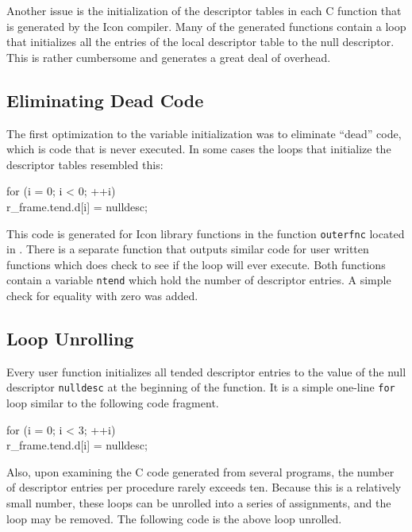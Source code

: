 Another issue is the initialization of the descriptor tables in each C
function that is generated by the Icon compiler.  Many of the
generated functions contain a loop that initializes all the entries of
the local descriptor table to the null descriptor. This is rather
cumbersome and generates a great deal of overhead.


\subsection{Eliminating Dead Code}

The first optimization to the variable initialization was to eliminate
``dead'' code, which is code that is never executed. In some cases the
loops that initialize the descriptor tables resembled this:

\goodbreak
\begin{iconcode}
for (i = 0; i < 0; ++i)\\
\>r\_frame.tend.d[i] = nulldesc;\\
\end{iconcode}


This code is generated for Icon library functions in the function
\texttt{outerfnc} located in . There is a separate
function that outputs similar code for user written functions which
does check to see if the loop will ever execute. Both functions
contain a variable \texttt{ntend} which hold the number of descriptor
entries. A simple check for equality with zero was added.

\subsection{Loop Unrolling}

Every user function initializes all tended descriptor entries to the
value of the null descriptor \texttt{nulldesc} at the beginning of the
function. It is a simple one-line \texttt{for} loop similar to the
following code fragment.

\goodbreak
\begin{iconcode}
for (i = 0; i < 3; ++i)\\
\>r\_frame.tend.d[i] = nulldesc;\\
\end{iconcode}


Also, upon examining the C code generated from several programs, the
number of descriptor entries per procedure rarely exceeds ten. Because
this is a relatively small number, these loops can be unrolled into a
series of assignments, and the loop may be removed. The following code
is the above loop unrolled.

